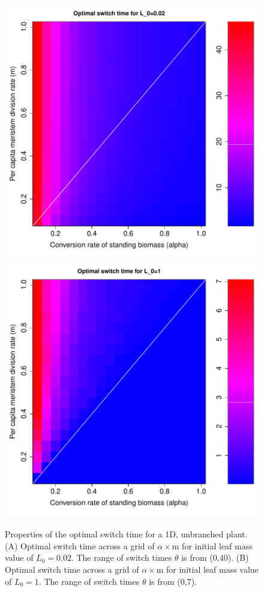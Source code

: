 \documentclass[12pt, oneside]{article}   	%
\begin{document}
\clearpage
\newpage

\begin{figure}[!h]
       \includegraphics[width=.5\textwidth]{../../figures/1d-0.02-zoom.pdf}  
       \includegraphics[width=.5\textwidth]{../../figures/1d-1-zoom.pdf}  
    \caption{ Properties of the optimal switch time for a 1D, unbranched plant. (A) Optimal switch time across a grid of $\alpha \times \mathrm{m}$ for initial leaf mass value of $L_0 = 0.02$. The range of switch times $\theta$ is from (0,40). (B) Optimal switch time across a grid of $\alpha \times \mathrm{m}$ for initial leaf mass value of $L_0 = 1$. The range of switch times $\theta$ is from (0,7).   }
 \label{fig:figure-x}
\end{figure}
\end{document}
